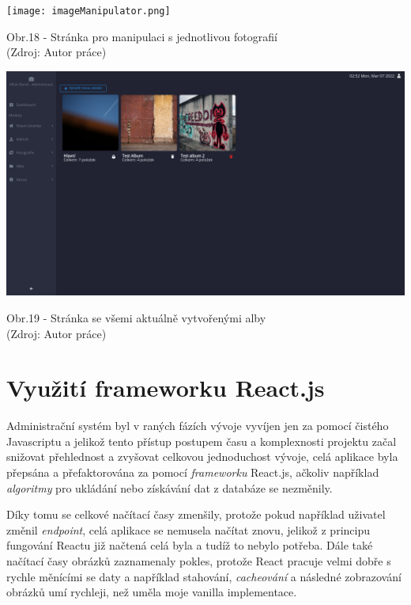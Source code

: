 \documentclass[12pt,a4paper]{report}
\begin{document}
  \vspace*{0.5cm}
  \noindent\texttt{[image: imageManipulator.png]}
  \begin{center}
    Obr.18 - Stránka pro manipulaci s jednotlivou fotografií \\
    (Zdroj: Autor práce)
  \end{center}
  \vspace*{0.5cm}

  \vspace*{0.5cm}
  \noindent\includegraphics[width=\linewidth]{albums.png}
  \begin{center}
    Obr.19 -  Stránka se všemi aktuálně vytvořenými alby \\
    (Zdroj: Autor práce)
  \end{center}
  \vspace*{0.5cm}

  \section{Využití frameworku React.js}
  Administrační systém byl v raných fázích vývoje vyvíjen jen za pomocí čistého Javascriptu a
  jelikož tento přístup postupem času a komplexnosti projektu začal snižovat přehlednost a zvyšovat 
  celkovou jednoduchost vývoje, celá aplikace byla přepsána a přefaktorována za pomocí 
  \emph{frameworku} React.js, ačkoliv například \emph{algoritmy} pro ukládání nebo získávání dat z databáze se nezměnily.

  Díky tomu se celkové načítací časy zmenšily, protože pokud například uživatel změnil \emph{endpoint}, celá aplikace se 
  nemusela načítat znovu, jelikož z principu fungování Reactu již načtená celá byla a tudíž to nebylo potřeba. 
  Dále také načítací časy obrázků zaznamenaly pokles, protože React pracuje velmi dobře s rychle měnícími se
  daty a například stahování, \emph{cacheování} a následné zobrazování obrázků umí rychleji, než uměla moje vanilla implementace.
  
\end{document}
